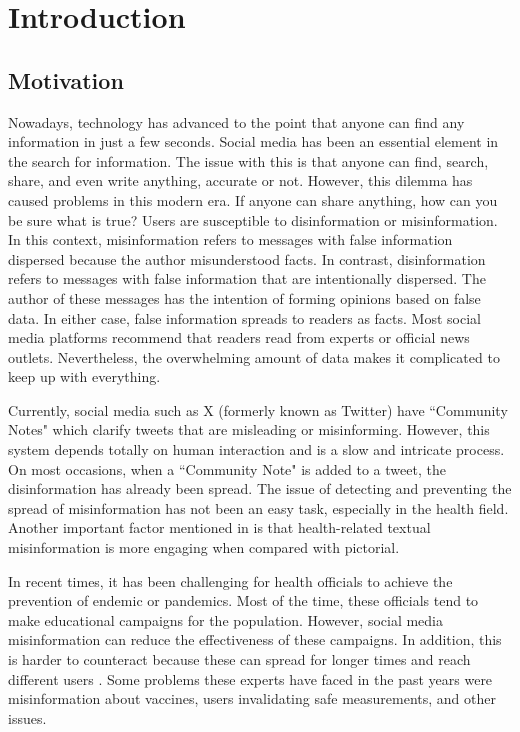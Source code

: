 

\chapter{Introduction}

\section{Motivation}

\noindent Nowadays, technology has advanced to the point that anyone can find any information in just a few seconds. Social media has been an essential
element in the search for information. The issue with this is that anyone can find, search, share, and even write anything, accurate or not. However, this dilemma
has caused problems in this modern era. If anyone can share anything, how can you be sure what is true? Users are susceptible to disinformation or misinformation.
In this context, misinformation refers to messages with false information dispersed because the author misunderstood facts. In contrast, disinformation refers to
messages with false information that are intentionally dispersed. The author of these messages has the intention of forming opinions based on false data. In either
case, false information spreads to readers as facts. Most social media platforms recommend that readers read from experts or official news outlets. Nevertheless,
the overwhelming amount of data makes it complicated to keep up with everything.

Currently, social media such as X (formerly known as Twitter) have ``Community Notes" which clarify tweets that are misleading or misinforming. However, this system
depends totally on human interaction and is a slow and intricate process. On most occasions, when a ``Community Note" is added to a tweet, the disinformation has
already been spread. The issue of detecting and preventing the spread of misinformation has not been an easy task, especially in the health field. Another important
factor mentioned in \cite{article} is that health-related textual misinformation is more engaging when compared with pictorial.

In recent times, it has been challenging for health officials to achieve the prevention of endemic or pandemics. Most of the time, these officials tend to make educational
campaigns for the population. However, social media misinformation can reduce the effectiveness of these campaigns. In addition, this is harder to counteract because
these can spread for longer times and reach different users \cite{article}. Some problems these experts have faced in the past years were misinformation
about vaccines, users invalidating safe measurements, and other issues.

